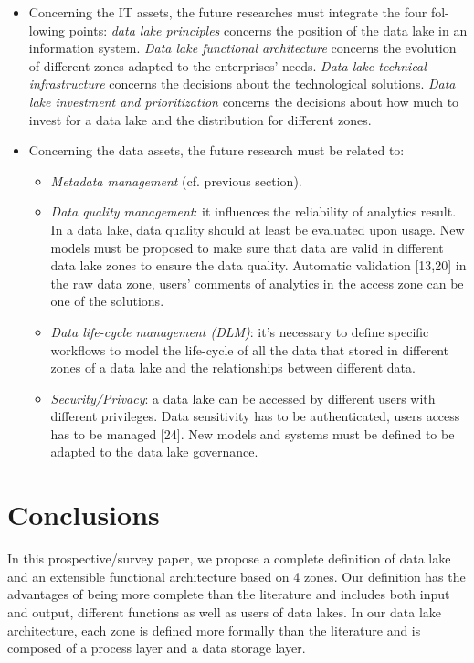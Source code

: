 \documentclass[a4paper,12pt,notitlepage,twoside,openright]{article}
\begin{document}
\begin{itemize}
\item
  Concerning the IT assets, the future researches must integrate the
  four fol-lowing points: \emph{data lake principles} concerns the
  position of the data lake in an information system. \emph{Data lake
  functional architecture} concerns the evolution of different zones
  adapted to the enterprises' needs. \emph{Data lake technical
  infrastructure} concerns the decisions about the technological
  solutions. \emph{Data lake investment and prioritization} concerns the
  decisions about how much to invest for a data lake and the
  distribution for different zones.
\item
  Concerning the data assets, the future research must be related to:

  \begin{itemize}
  \item
    \emph{Metadata management} (cf. previous section).
  \item
    \emph{Data quality management}: it influences the reliability of
    analytics result. In a data lake, data quality should at least be
    evaluated upon usage. New models must be proposed to make sure that
    data are valid in different data lake zones to ensure the data
    quality. Automatic validation {[}13,20{]} in the raw data zone,
    users' comments of analytics in the access zone can be one of the
    solutions.
  \item
    \emph{Data life-cycle management (DLM)}: it's necessary to define
    specific workflows to model the life-cycle of all the data that
    stored in different zones of a data lake and the relationships
    between different data.
  \item
    \emph{Security/Privacy}: a data lake can be accessed by different
    users with different privileges. Data sensitivity has to be
    authenticated, users access has to be managed {[}24{]}. New models
    and systems must be defined to be adapted to the data lake
    governance.
  \end{itemize}
\end{itemize}

\hypertarget{conclusions}{%
\section{Conclusions}\label{conclusions}}

In this prospective/survey paper, we propose a complete definition of
data lake and an extensible functional architecture based on 4 zones.
Our definition has the advantages of being more complete than the
literature and includes both input and output, different functions as
well as users of data lakes. In our data lake architecture, each zone is
defined more formally than the literature and is composed of a process
layer and a data storage layer.
\end{document}

